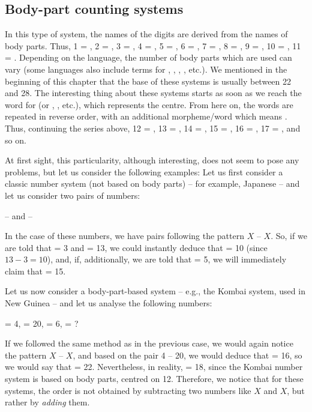 \begin{refsection}
\section{Body-part counting systems}

In this type of system, the names of the digits are derived from the names of body parts. Thus, 1 = , 2 = , 3 = , 4 = , 5 = , 6 = , 7 = , 8 = , 9 = , 10 = , 11 = . Depending on the language, the number of body parts which are used can vary (some languages also include terms for , , , , etc.). We mentioned in the beginning of this chapter that the base of these systems is usually between 22 and 28. The interesting thing about these systems starts as soon as we reach the word for  (or , , etc.), which represents the centre. From here on, the words are repeated in reverse order, with an additional morpheme/word which means . Thus, continuing the series above, 12 = , 13 = , 14 = , 15 = , 16 = , 17 = , and so on.

At first sight, this particularity, although interesting, does not seem to pose any problems, but let us consider the following examples:
\ea Let us first consider a classic number system (not based on body parts) -- for example, Japanese -- and let us consider two pairs of numbers:

{ --  and  -- }
\z

In the case of these numbers, we have pairs following the pattern $X$ -- $X$. So, if we are told that  = 3 and  = 13, we could instantly deduce that  = 10 (since $13 - 3 = 10$), and, if, additionally, we are told that  = 5, we will immediately claim that  = 15.

\ea Let us now consider a body-part-based system -- e.g., the Kombai system, used in New Guinea -- and let us analyse the following numbers:

{ = 4,  = 20,  = 6,  = ?}
\z

 If we followed the same method as in the previous case, we would again notice the pattern $X$ --  $X$, and based on the pair 4 -- 20, we would deduce that  = 16, so we would say that  = 22. Nevertheless, in reality,  = 18, since the Kombai number system is based on body parts, centred on 12. Therefore, we notice that for these systems, the order is not obtained by subtracting two numbers like $X$ and  $X$, but rather by \emph{adding} them.


\end{refsection}
